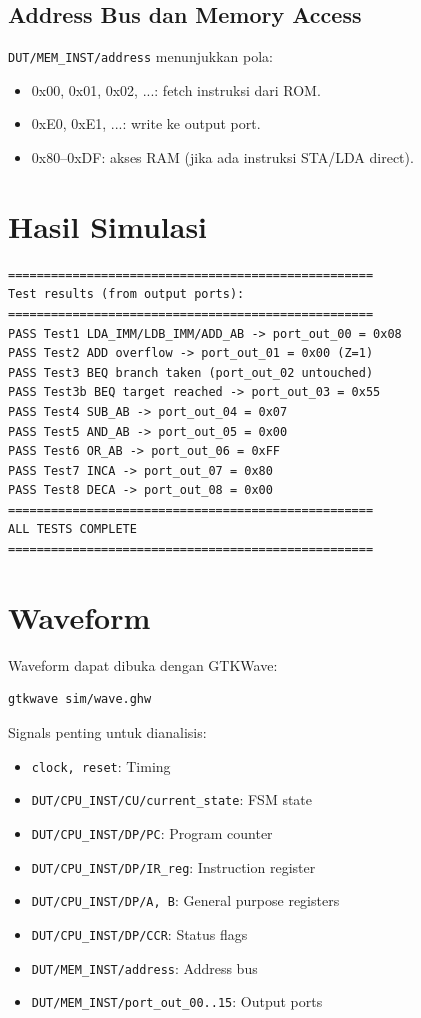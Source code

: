 \documentclass[12pt,a4paper]{report}
\begin{document}
\subsection{Address Bus dan Memory Access}

\texttt{DUT/MEM\_INST/address} menunjukkan pola:
\begin{itemize}
  \item 0x00, 0x01, 0x02, ...: fetch instruksi dari ROM.
  \item 0xE0, 0xE1, ...: write ke output port.
  \item 0x80--0xDF: akses RAM (jika ada instruksi STA/LDA direct).
\end{itemize}

\section{Hasil Simulasi}

\begin{lstlisting}
===================================================
Test results (from output ports):
===================================================
PASS Test1 LDA_IMM/LDB_IMM/ADD_AB -> port_out_00 = 0x08
PASS Test2 ADD overflow -> port_out_01 = 0x00 (Z=1)
PASS Test3 BEQ branch taken (port_out_02 untouched)
PASS Test3b BEQ target reached -> port_out_03 = 0x55
PASS Test4 SUB_AB -> port_out_04 = 0x07
PASS Test5 AND_AB -> port_out_05 = 0x00
PASS Test6 OR_AB -> port_out_06 = 0xFF
PASS Test7 INCA -> port_out_07 = 0x80
PASS Test8 DECA -> port_out_08 = 0x00
===================================================
ALL TESTS COMPLETE
===================================================
\end{lstlisting}

\section{Waveform}

Waveform dapat dibuka dengan GTKWave:

\begin{lstlisting}[language=bash]
gtkwave sim/wave.ghw
\end{lstlisting}

Signals penting untuk dianalisis:
\begin{itemize}
  \item \texttt{clock, reset}: Timing
  \item \texttt{DUT/CPU\_INST/CU/current\_state}: FSM state
  \item \texttt{DUT/CPU\_INST/DP/PC}: Program counter
  \item \texttt{DUT/CPU\_INST/DP/IR\_reg}: Instruction register
  \item \texttt{DUT/CPU\_INST/DP/A, B}: General purpose registers
  \item \texttt{DUT/CPU\_INST/DP/CCR}: Status flags
  \item \texttt{DUT/MEM\_INST/address}: Address bus
  \item \texttt{DUT/MEM\_INST/port\_out\_00..15}: Output ports
\end{itemize}
\end{document}
